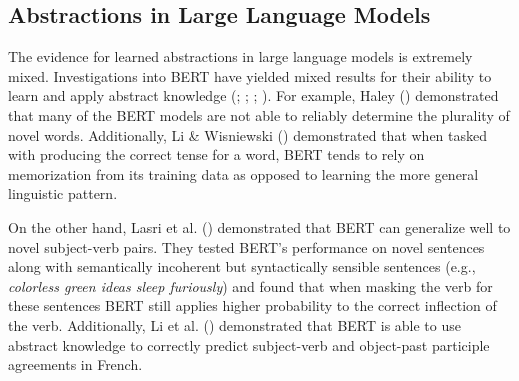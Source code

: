 \documentclass[
  12pt,
  letterpaper,
]{scrreprt}
\begin{document}
\subsection{Abstractions in Large Language
Models}\label{abstractions-in-large-language-models}

The evidence for learned abstractions in large language models is
extremely mixed. Investigations into BERT have yielded mixed results for
their ability to learn and apply abstract knowledge
(;
;
;
). For
example, Haley () demonstrated
that many of the BERT models are not able to reliably determine the
plurality of novel words. Additionally, Li \& Wisniewski
() demonstrated that when
tasked with producing the correct tense for a word, BERT tends to rely
on memorization from its training data as opposed to learning the more
general linguistic pattern.

On the other hand, Lasri et al.
() demonstrated that
BERT can generalize well to novel subject-verb pairs. They tested BERT's
performance on novel sentences along with semantically incoherent but
syntactically sensible sentences (e.g., \emph{colorless green ideas
sleep furiously}) and found that when masking the verb for these
sentences BERT still applies higher probability to the correct
inflection of the verb. Additionally, Li et al.
() demonstrated
that BERT is able to use abstract knowledge to correctly predict
subject-verb and object-past participle agreements in French.
\end{document}

